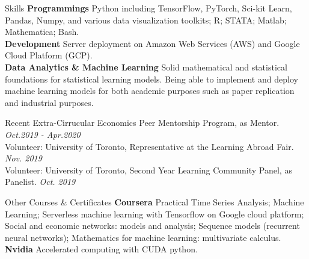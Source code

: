 \documentclass{resume} %
\begin{document}
\begin{rSection}{Skills}
\textbf{Programmings} Python including TensorFlow, PyTorch, Sci-kit Learn, Pandas, Numpy, and various data visualization toolkits; R; STATA; Matlab; Mathematica; Bash.
\\\textbf{Development} Server deployment on Amazon Web Services (AWS) and Google Cloud Platform (GCP).
\\\textbf{Data Analytics \& Machine Learning} Solid mathematical and statistical foundations for statistical learning models. Being able to implement and deploy machine learning models for both academic purposes such as paper replication and industrial purposes.
\end{rSection}

\begin{rSection}{Recent Extra-Cirrucular} 
	Economics Peer Mentorship Program, as Mentor. \hfill \emph{Oct.2019 - Apr.2020}
	\\
	Volunteer: University of Toronto, Representative at the Learning Abroad Fair. \hfill \emph{Nov. 2019}
	\\
	Volunteer: University of Toronto, Second Year Learning Community Panel, as Panelist. \hfill \emph{Oct. 2019}
\end{rSection}

\begin{rSection}{Other Courses \& Certificates}
	\textbf{Coursera} Practical Time Series Analysis; Machine Learning; Serverless machine learning with Tensorflow on Google cloud platform; Social and economic networks: models and analysis; Sequence models (recurrent neural networks); Mathematics for machine learning: multivariate calculus.
	\\
	\textbf{Nvidia} Accelerated computing with CUDA python.
\end{rSection}


%
%
%
\end{document}
